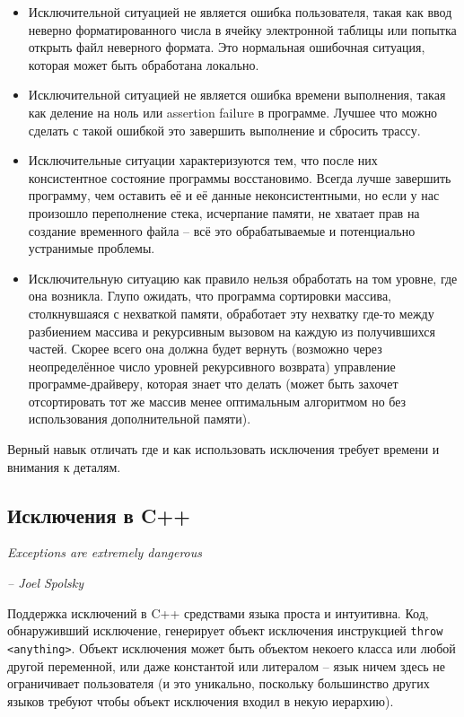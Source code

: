 \documentclass[a4paper,12pt,oneside]{article}
\begin{document}
\begin{itemize}
\item
Исключительной ситуацией не является ошибка пользователя, такая как ввод неверно форматированного числа в ячейку электронной таблицы или попытка открыть файл неверного формата. Это нормальная ошибочная ситуация, которая может быть обработана локально.
\item
Исключительной ситуацией не является ошибка времени выполнения, такая как деление на ноль или assertion failure в программе. Лучшее что можно сделать с такой ошибкой это завершить выполнение и сбросить трассу.
\item
Исключительные ситуации характеризуются тем, что после них консистентное состояние программы восстановимо. Всегда лучше завершить программу, чем оставить её и её данные неконсистентными, но если у нас произошло переполнение стека, исчерпание памяти, не хватает прав на создание временного файла -- всё это обрабатываемые и потенциально устранимые проблемы.
\item
Исключительную ситуацию как правило нельзя обработать на том уровне, где она возникла. Глупо ожидать, что программа сортировки массива, столкнувшаяся с нехваткой памяти, обработает эту нехватку где-то между разбиением массива и рекурсивным вызовом на каждую из получившихся частей. Скорее всего она должна будет вернуть (возможно через неопределённое число уровней рекурсивного возврата) управление программе-драйверу, которая знает что делать (может быть захочет отсортировать тот же массив менее оптимальным алгоритмом но без использования дополнительной памяти).
\end{itemize}

Верный навык отличать где и как использовать исключения требует времени и внимания к деталям.

\pagebreak
\subsection{Исключения в C++}\label{CppExceptions}

\hfill\textit{Exceptions are extremely dangerous}{\vspace{0.5em}}

\hfill\textit{-- Joel Spolsky}

Поддержка исключений в C++ средствами языка проста и интуитивна. Код, обнаруживший исключение, генерирует объект исключения инструкцией \lstinline!throw <anything>!. Объект исключения может быть объектом некоего класса или любой другой переменной, или даже константой или литералом -- язык ничем здесь не ограничивает пользователя (и это уникально, поскольку большинство других языков требуют чтобы объект исключения входил в некую иерархию). 
\end{document}
